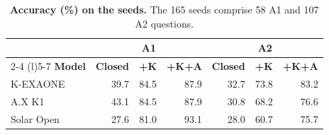 \begin{table}[t]
\centering
\small
\setlength{\tabcolsep}{4pt}
\caption{\textbf{Accuracy (\%) on the seeds.}
The 165 seeds comprise 58 A1 and 107 A2 questions.}
\label{tab:seed_results}
\begin{tabular}{@{}lrrrrrr@{}}
\toprule
 & \multicolumn{3}{c}{\textbf{A1}} & \multicolumn{3}{c}{\textbf{A2}} \\
\cmidrule(lr){2-4} \cmidrule(l){5-7}
\textbf{Model} & \textbf{Closed} & \textbf{+K} & \textbf{+K+A} & \textbf{Closed} & \textbf{+K} & \textbf{+K+A} \\
\midrule
K-EXAONE   & 39.7 & 84.5 & 87.9 & 32.7 & 73.8 & 83.2 \\
A.X K1     & 43.1 & 84.5 & 87.9 & 30.8 & 68.2 & 76.6 \\
Solar Open & 27.6 & 81.0 & 93.1 & 28.0 & 60.7 & 75.7 \\
\bottomrule
\end{tabular}
\end{table}
